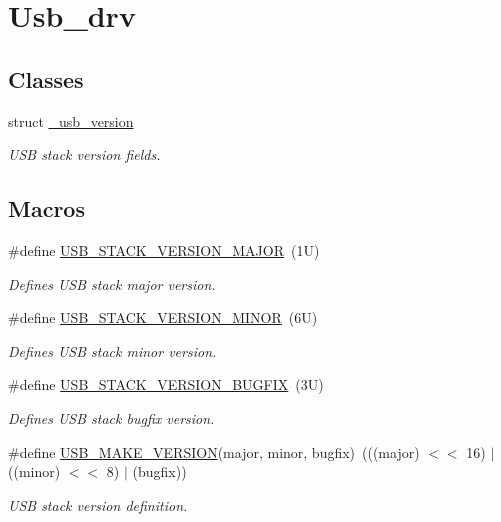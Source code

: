 \hypertarget{group__usb__drv}{\section{Usb\-\_\-drv}
\label{group__usb__drv}
}
\subsection*{Classes}
\begin{DoxyCompactItemize}
\item 
struct \hyperlink{struct__usb__version}{\-\_\-usb\-\_\-version}
\begin{DoxyCompactList}\small\item\em U\-S\-B stack version fields. \end{DoxyCompactList}\end{DoxyCompactItemize}
\subsection*{Macros}
\begin{DoxyCompactItemize}
\item 
\#define \hyperlink{group__usb__drv_ga748c984a1c47a981517bcd69bbde81d0}{U\-S\-B\-\_\-\-S\-T\-A\-C\-K\-\_\-\-V\-E\-R\-S\-I\-O\-N\-\_\-\-M\-A\-J\-O\-R}~(1\-U)
\begin{DoxyCompactList}\small\item\em Defines U\-S\-B stack major version. \end{DoxyCompactList}\item 
\#define \hyperlink{group__usb__drv_gaa7232ea54594fbf6cedfd486a723985a}{U\-S\-B\-\_\-\-S\-T\-A\-C\-K\-\_\-\-V\-E\-R\-S\-I\-O\-N\-\_\-\-M\-I\-N\-O\-R}~(6\-U)
\begin{DoxyCompactList}\small\item\em Defines U\-S\-B stack minor version. \end{DoxyCompactList}\item 
\#define \hyperlink{group__usb__drv_ga32b306d2cf41bca7370f9ea66dda6872}{U\-S\-B\-\_\-\-S\-T\-A\-C\-K\-\_\-\-V\-E\-R\-S\-I\-O\-N\-\_\-\-B\-U\-G\-F\-I\-X}~(3\-U)
\begin{DoxyCompactList}\small\item\em Defines U\-S\-B stack bugfix version. \end{DoxyCompactList}\item 
\#define \hyperlink{group__usb__drv_gaf9019052932ee7a0d4f5c28c4eefffd9}{U\-S\-B\-\_\-\-M\-A\-K\-E\-\_\-\-V\-E\-R\-S\-I\-O\-N}(major, minor, bugfix)~(((major) $<$$<$ 16) $\vert$ ((minor) $<$$<$ 8) $\vert$ (bugfix))
\begin{DoxyCompactList}\small\item\em U\-S\-B stack version definition. \end{DoxyCompactList}\end{DoxyCompactItemize}
